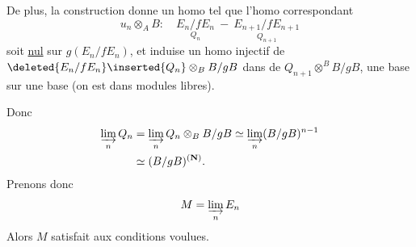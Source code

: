 De plus, la construction donne un homo
tel que l'homo correspondant
\[
u_n\otimes_A B:\quad\underset{Q_n}{E_n/fE_n}\ -\ \underset{Q_{n+1}}{E_{n+1}/fE_{n+1}}
\]
soit \uline{nul} sur $g(E_n/fE_n)$, et induise un
homo injectif de  $\deleted{E_n/fE_n}\inserted{Q_n}\otimes_B B/gB$ dans
de $Q_{n+1}\otimes^B B/gB$,  une base sur
une base (on est dans modules libres).

Donc
\[
\begin{aligned}
\varinjlim_n Q_n&=\varinjlim_n Q_n\otimes_B B/gB\simeq\varinjlim_n(B/gB)^{n-1}\\
&\simeq(B/gB)^{(\mathbf N)}.
\end{aligned}
\]
Prenons donc
\[
M=\varinjlim_n E_n
\]
Alors $M$ satisfait aux conditions voulues.

